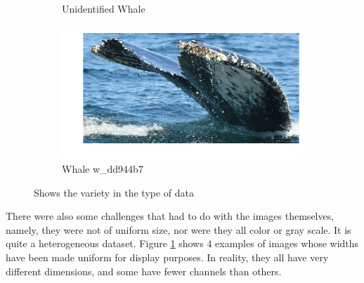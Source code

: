 \begin{figure}[h!]
\begin{subfigure}{.5\textwidth}
		\caption{Unidentified Whale}
	\end{subfigure}
	\begin{subfigure}{.5\textwidth}
		\includegraphics[width=.7\linewidth]{images/w_dd944b7.png}
		\caption{Whale w\_dd944b7}
	\end{subfigure}
	\caption{\label{fig:whale}Shows the variety in the type of data}
\end{figure}

There were also some challenges that had to do with the images themselves, namely, they were not of uniform size, nor were they all color or gray scale. It is quite a heterogeneous dataset. Figure \ref{fig:whale} shows 4 examples of images whose widths have been made uniform for display purposes. In reality, they all have very different dimensions, and some have fewer channels than others.\\




